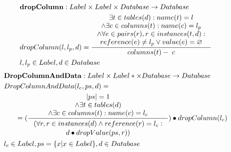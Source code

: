 \documentclass[11pt]{article}
\begin{document}
\begin{align*}
&	\mathbf{dropColumn} : Label \times Label \times Database \rightarrow Database \\
& 	dropColumn(l, l_p, d) = \inference{ \exists t \in tables(d) : name(t) = l \\ \wedge \exists c \in columns(t) : name(c) = l_p \\ \wedge \forall e \in  pairs(r), r \in instances(t, d) : \\ reference(e) \neq l_p \vee value(e) = \varnothing  }{columns(t) - \; c}\\
&	 l , l_p\in Label, d \in Database 
\end{align*}
\begin{align*}
&	\mathbf{DropColumnAndData} : Label \times Label* \times Database \rightarrow Database \\
&	DropColumnAndData(l_c, ps, d) = \\
& \;\;\;\;\;\; =%
 	(\inference{|ps| = 1 \\ \wedge \exists t \in tables(d) \\ \wedge \exists c \in columns(t) : name(c) = l_c}{\begin{gathered}
	 	(\forall r, r \in instances(d) \wedge reference(r) = l_c: \\d \bullet dropValue(ps, r)) \end{gathered}})  \bullet dropColumn(l_c)  
	\\
&	l_c \in Label, ps = \{ x | x \in Label\}, d \in Database
\end{align*}
\end{document}
